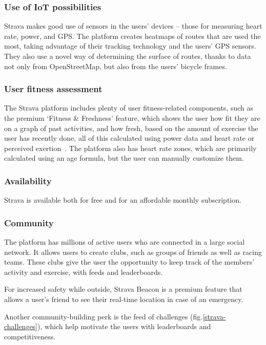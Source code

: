 \subsubsection*{Use of IoT possibilities}
Strava makes good use of sensors in the users' devices -- those for measuring heart rate, power, and GPS.
The platform creates heatmaps of routes that are used the most, taking advantage of their tracking technology and the users' GPS sensors.
They also use a novel way of determining the surface of routes, thanks to data not only from OpenStreetMap, but also from the users' bicycle frames.

\subsubsection*{User fitness assessment}
The Strava platform includes plenty of user fitness-related components, such as the premium `Fitness \& Freshness' feature,
which shows the user how fit they are on a graph of past activities, and how fresh, based on the amount of exercise the user has recently done,
all of this calculated using power data and heart rate or perceived exertion~\cite{strava-fitness-freshness}.
The platform also has heart rate zones, which are primarily calculated using an age formula, but the user can manually customize them.
\subsubsection*{Availability}
Strava is available both for free and for an affordable monthly subscription.
\subsubsection*{Community}
The platform has millions of active users who are connected in a large social network.
It allows users to create clubs, such as groups of friends as well as racing teams.
These clubs give the user the opportunity to keep track of the members' activity and exercise, with feeds and leaderboards.

For increased safety while outside, Strava Beacon is a premium feature that allows a user's friend to see their real-time location in case of an emergency.

Another community-building perk is the feed of challenges (fig.\ref{strava-challenges}), which help motivate the users with leaderboards and competitiveness.

